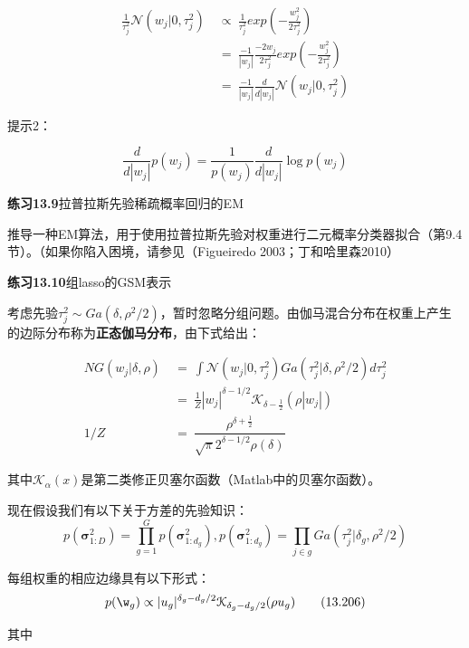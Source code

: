 \documentclass[a4paper]{article}
\begin{document}
\begin{align}
	\frac{1}{\tau_j^2}\mathcal{N}(w_j|0,\tau_j^2)\ &\propto\ \frac{1}{\tau_j^2}exp(-\frac{w_j^2}{2\tau_j^2})\tag{13.198}\\
	&=\ \frac{-1}{|w_j|}\frac{-2w_j}{2\tau_j^2}exp(-\frac{w_j^2}{2\tau_j^2})\tag{13.199}\\
	&=\ \frac{-1}{|w_j|}\frac{d}{d|w_j|}\mathcal{N}(w_j|0,\tau_j^2)\tag{13.200}
\end{align}

提示2：

\begin{equation}
	\frac{d}{d|w_j|}p(w_j)=\frac{1}{p(w_j)}\frac{d}{d|w_j|}\log p(w_j)\tag{13.201}
\end{equation}

\textbf{练习13.9}拉普拉斯先验稀疏概率回归的EM

推导一种EM算法，用于使用拉普拉斯先验对权重进行二元概率分类器拟合（第9.4节）。（如果你陷入困境，请参见（Figueiredo 2003；丁和哈里森2010）

\textbf{练习13.10}组lasso的GSM表示

考虑先验$\tau_j^2\sim Ga(\delta,\rho^2/2)$，暂时忽略分组问题。由伽马混合分布在权重上产生的边际分布称为\textbf{正态伽马分布}，由下式给出：

\begin{align}
	NG(w_j|\delta,\rho)\ &=\ \int \mathcal{N}(w_j|0,\tau_j^2)Ga(\tau_j^2|\delta,\rho^2/2)d\tau_j^2\tag{13.202}\\
	&=\ \frac{1}{Z}|w_j|^{\delta-1/2}\mathcal{K}_{\delta-\frac{1}{2}}(\rho|w_j|)\tag{13.203}\\
	1/Z\ &=\ \dfrac{\rho^{\delta+\frac{1}{2}}}{\sqrt{\pi}2^{\delta-1/2}\rho(\delta)}\tag{13.204}
\end{align}

其中$\mathcal{K}_{\alpha}(x)$是第二类修正贝塞尔函数（Matlab中的贝塞尔函数）。

现在假设我们有以下关于方差的先验知识：
\begin{equation}
	p(\boldsymbol{\sigma}_{1:D}^2)=\prod_{g=1}^{G}p(\boldsymbol{\sigma}_{1:d_g}^2),p(\boldsymbol{\sigma}_{1:d_g}^2)=\prod_{j\in g}Ga(\tau_j^2|\delta_g,\rho^2/2)\tag{13.205}
\end{equation}

每组权重的相应边缘具有以下形式：
\begin{equation}
	p(\w_g)\propto |u_g|^{\delta_g-d_g/2}\mathcal{K}_{\delta_g-d_g/2}(\rho u_g)\tag{13.206}
\end{equation}

其中
\end{document}
